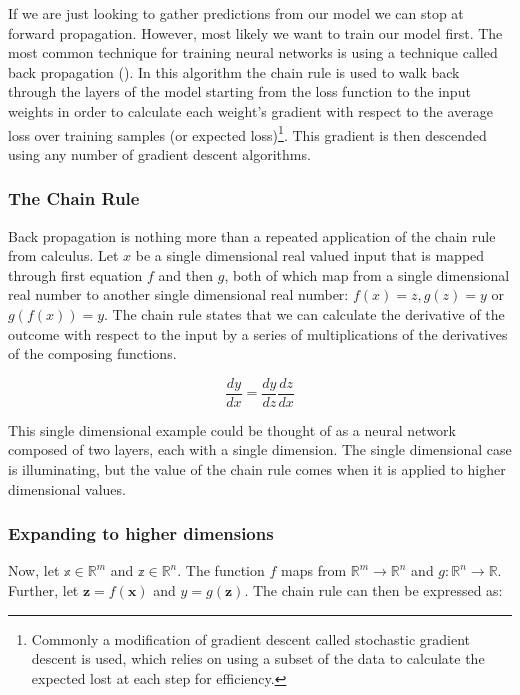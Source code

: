 \documentclass[]{book}
\let\rmarkdownfootnote\footnote%
\def\footnote{\protect\rmarkdownfootnote}
\theoremstyle{definition}
\theoremstyle{definition}
\theoremstyle{definition}
\theoremstyle{remark}
\begin{document}
If we are just looking to gather predictions from our model we can stop
at forward propagation. However, most likely we want to train our model
first. The most common technique for training neural networks is using a
technique called back propagation (\citet{backprop_1986}). In this
algorithm the chain rule is used to walk back through the layers of the
model starting from the loss function to the input weights in order to
calculate each weight's gradient with respect to the average loss over
training samples (or expected loss)\footnote{Commonly a modification of
  gradient descent called stochastic gradient descent is used, which
  relies on using a subset of the data to calculate the expected lost at
  each step for efficiency.}. This gradient is then descended using any
number of gradient descent algorithms.

\subsubsection{The Chain Rule}\label{the-chain-rule}

Back propagation is nothing more than a repeated application of the
chain rule from calculus. Let \(x\) be a single dimensional real valued
input that is mapped through first equation \(f\) and then \(g\), both
of which map from a single dimensional real number to another single
dimensional real number: \(f(x) = z, g(z) = y\) or \(g(f(x)) = y\). The
chain rule states that we can calculate the derivative of the outcome
with respect to the input by a series of multiplications of the
derivatives of the composing functions.

\begin{equation} 
  \frac{dy}{dx} = \frac{dy}{dz}\frac{dz}{dx}
  \label{eq:chainrule}
\end{equation}

This single dimensional example could be thought of as a neural network
composed of two layers, each with a single dimension. The single
dimensional case is illuminating, but the value of the chain rule comes
when it is applied to higher dimensional values.

\subsubsection{Expanding to higher
dimensions}\label{expanding-to-higher-dimensions}

Now, let \(\mathbb{x} \in \mathbb{R}^m\) and
\(\mathbb{z} \in \mathbb{R}^n\). The function \(f\) maps from
\(\mathbb{R}^m \to \mathbb{R}^n\) and
\(g: \mathbb{R}^n \to \mathbb{R}\). Further, let
\(\textbf{z} = f(\textbf{x})\) and \(y = g(\textbf{z})\). The chain rule
can then be expressed as:
\end{document}
